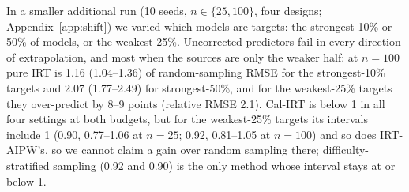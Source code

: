 In a smaller additional run (10 seeds, $n\in\{25,100\}$, four designs; Appendix~\ref{app:shift}) we varied which models are targets: the strongest 10\% or 50\% of models, or the weakest 25\%. Uncorrected predictors fail in every direction of extrapolation, and most when the sources are only the weaker half: at $n=100$ pure IRT is 1.16 (1.04--1.36) of random-sampling RMSE for the strongest-10\% targets and 2.07 (1.77--2.49) for strongest-50\%, and for the weakest-25\% targets they over-predict by 8--9 points (relative RMSE 2.1). Cal-IRT is below 1 in all four settings at both budgets, but for the weakest-25\% targets its intervals include 1 (0.90, 0.77--1.06 at $n=25$; 0.92, 0.81--1.05 at $n=100$) and so does IRT-AIPW's, so we cannot claim a gain over random sampling there; difficulty-stratified sampling (0.92 and 0.90) is the only method whose interval stays at or below 1.
